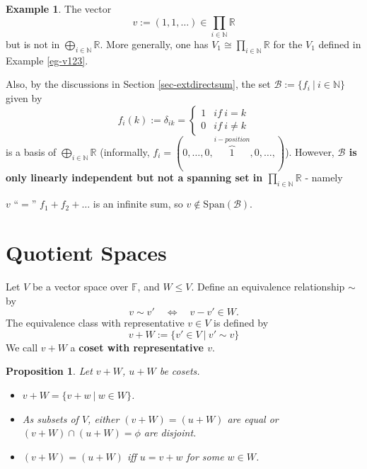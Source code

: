 \documentclass[11pt,openany]{book}
\theoremstyle{plain}
\newtheorem{proposition}[proposition]{Proposition}
\theoremstyle{definition}
\newtheorem{example}[example]{Example}
\theoremstyle{remark}
\begin{document}
\begin{example}
The vector 
    $$v := (1,1, \dots ) \in \prod_{i \in \mathbb{N}} \mathbb{R}$$
but is not in $\bigoplus_{i \in \mathbb{N}} \mathbb{R}$. More generally, one has $V_1 \cong \prod_{i \in \mathbb{N}} \mathbb{R}$ for the $V_1$ defined in Example \ref{eg-v123}.

Also, by the discussions in Section \ref{sec-extdirectsum}, the set 
$\mathcal{B} := \{f_i\ |\ i \in \mathbb{N}\}$
given by 
$$f_i(k) := \delta_{ik} = \begin{cases} 1 & if\ i = k \\ 0 & if\ i \neq k \end{cases}$$ is a basis of $\bigoplus_{i \in \mathbb{N}} \mathbb{R}$ (informally, $f_i = (0, \dots, 0, \overbrace{1}^{i-position}, 0, \dots, )$). However, {\bf $\mathcal{B}$ is only linearly independent but  not a spanning set in $\prod_{i \in \mathbb{N}} \mathbb{R}$} - namely
\begin{center}
    $v$ ``$=$'' $f_1 + f_2 + \dots$ is an infinite sum, so $v \notin \mathrm{Span}(\mathcal{B})$.
\end{center}
\end{example}


\section{Quotient Spaces}
Let $V$ be a vector space over $\mathbb{F}$, and $W \leq V$. Define an equivalence relationship $\sim$ by
$$v \sim v' \quad \Longleftrightarrow \quad v - v' \in W.$$
The equivalence class with representative $v \in V$ is defined by
$$v + W := \{v' \in V\ |\ v' \sim v\}$$
We call $v + W$ a {\bf coset with representative $v$}.

\begin{proposition} \label{prop-samecoset}
Let $v + W$, $u + W$ be cosets.
\begin{itemize}
    \item $v + W = \{v + w\ |\ w \in W\}$.
    \item As subsets of $V$, either $(v + W) = (u + W)$ are equal or $(v + W) \cap (u + W) = \phi$ are disjoint.
    \item $(v + W) = (u + W)$ iff $u = v+w$ for some $w \in W$.
\end{itemize}
\end{proposition}
\end{document}
